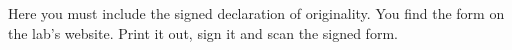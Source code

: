 \documentclass[11pt,a4paper,twoside]{report}
\begin{document}


\cleardoublepage

\fancyhead[LO]{\scshape \listfigurename}
\fancyhead[RO]{}
\fancyhead[LE]{}
\fancyhead[RE]{\scshape \listfigurename}
\listoffigures

\cleardoublepage

\fancyhead[LO]{\scshape \listtablename}
\fancyhead[RO]{}
\fancyhead[LE]{}
\fancyhead[RE]{\scshape \listtablename}
\listoftables

\cleardoublepage
\fancyhead[LO]{}
\fancyhead[RO]{}
\fancyhead[LE]{}
\fancyhead[RE]{}


%

Here you must include the signed declaration of originality. You find
the form on the lab's website. Print it out, sign it and scan the
signed form.
\end{document}
